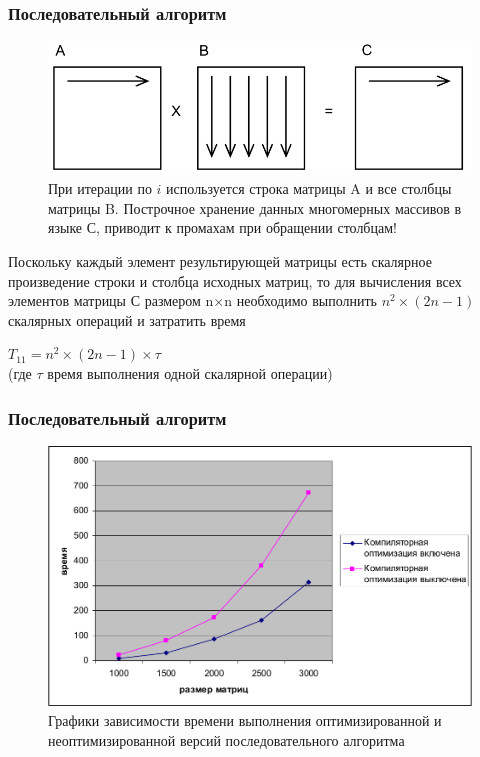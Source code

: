 \documentclass{beamer}
\begin{document}

\begin{frame}
\frametitle{Последовательный алгоритм}

\begin{figure}
\includegraphics[scale=0.30]{res/pic003}
\caption{При итерации по $i$ используется строка матрицы A и все столбцы матрицы B. Построчное хранение данных многомерных массивов в языке С, приводит к промахам при обращении столбцам!}
\end{figure}

Поскольку каждый элемент результирующей матрицы есть скалярное произведение строки и столбца исходных матриц, то для вычисления всех элементов матрицы С размером n×n необходимо выполнить $n^2 \times ( 2n - 1 )$ скалярных операций и затратить время
\begin{center}
 $T_11 = n^2 \times ( 2 n − 1 ) \times \tau$\\
(где $\tau$ время выполнения одной скалярной операции)
\end{center}

\end{frame}


\begin{frame}
\frametitle{Последовательный алгоритм}

\begin{figure}
\includegraphics[scale=0.32]{res/pic004}
\caption{Графики зависимости времени выполнения оптимизированной и неоптимизированной версий последовательного алгоритма}
\end{figure}

\end{frame}
\end{document}
